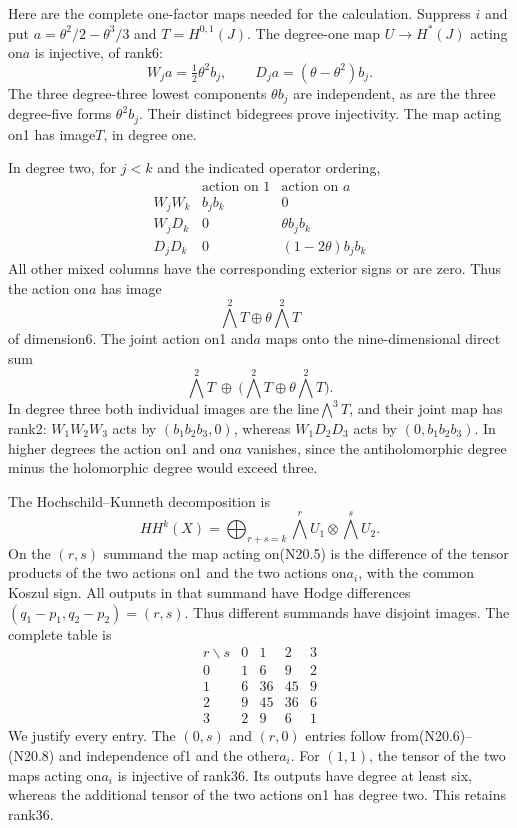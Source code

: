 Here are the complete one-factor maps needed for the calculation.
Suppress $i$ and put $a=\theta^2/2-\theta^3/3$ and
$T=H^{0,1}(J)$. The degree-one map $U\to H^*(J)$ acting on$a$
is injective, of rank6:
\[
 W_j a=\tfrac12\theta^2 b_j,\qquad
 D_j a=(\theta-\theta^2)b_j.                                  \tag{N20.6}
\]
The three degree-three lowest components $\theta b_j$ are
independent, as are the three degree-five forms $\theta^2b_j$.
Their distinct bidegrees prove injectivity. The map acting on1
has image$T$, in degree one.

In degree two, for $j<k$ and the indicated operator ordering,
\[
 \begin{array}{c|c|c}
        &\text{action on }1&\text{action on }a\\ \hline
 W_jW_k&b_jb_k&0\\
 W_jD_k&0&\theta b_jb_k\\
 D_jD_k&0&(1-2\theta)b_jb_k
 \end{array}                                                  \tag{N20.7}
\]
All other mixed columns have the corresponding exterior signs
or are zero. Thus the action on$a$ has image
\[
                   \bigwedge^2T\oplus\theta\bigwedge^2T
\]
of dimension6. The joint action on1 and$a$ maps onto the
nine-dimensional direct sum
\[
 \bigwedge^2T\ \oplus\
       \bigl(\bigwedge^2T\oplus\theta\bigwedge^2T\bigr).          \tag{N20.8}
\]
In degree three both individual images are the line$\bigwedge^3T$,
and their joint map has rank2: $W_1W_2W_3$ acts by
$(b_1b_2b_3,0)$, whereas $W_1D_2D_3$ acts by
$(0,b_1b_2b_3)$. In higher degrees the action on1 and on$a$
vanishes, since the antiholomorphic degree minus the holomorphic
degree would exceed three.

The Hochschild--Kunneth decomposition is
\[
 HH^k(X)=\bigoplus_{r+s=k}\bigwedge^rU_1\otimes\bigwedge^sU_2.
\]
On the $(r,s)$ summand the map acting on(N20.5) is the difference
of the tensor products of the two actions on1 and the two actions
on$a_i$, with the common Koszul sign. All outputs in that summand
have Hodge differences $(q_1-p_1,q_2-p_2)=(r,s)$.
Thus different summands have disjoint images. The complete table is
\[
 \begin{array}{c|rrrr}
 r\backslash s&0&1&2&3\\ \hline
 0&1&6&9&2\\
 1&6&36&45&9\\
 2&9&45&36&6\\
 3&2&9&6&1
 \end{array}                                                  \tag{N20.9}
\]
We justify every entry. The $(0,s)$ and $(r,0)$ entries follow
from(N20.6)--(N20.8) and independence of1 and the other$a_i$.
For $(1,1)$, the tensor of the two maps acting on$a_i$ is
injective of rank36. Its outputs have degree at least six,
whereas the additional tensor of the two actions on1 has
degree two. This retains rank36.

